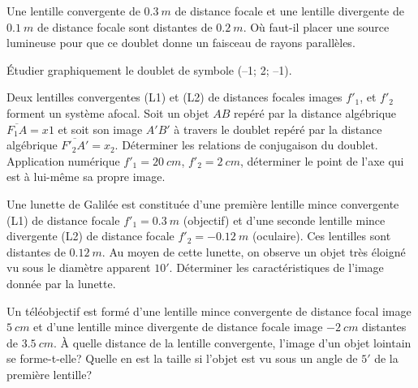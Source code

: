%
\begin{exercice}%
Une lentille convergente de \(\SI{0,3}{m}\) de distance focale et une lentille 
  divergente de \(\SI{0,1}{m}\) de distance focale sont distantes de 
  \(\SI{0,2}{m}\). Où faut-il placer une source lumineuse pour que ce doublet 
  donne un faisceau de rayons parallèles.
\end{exercice}%
%
\begin{exercice}%
Étudier graphiquement le doublet de symbole (–1; 2; –1).
\end{exercice}%
%
\begin{exercice}%
Deux lentilles convergentes (L1) et (L2) de distances focales images \(f'_1\), 
  et \(f'_2\) forment un système afocal. Soit un objet \(AB\) repéré par la 
  distance algébrique \(\overline{F_1A}= x1\) et soit son image \(A'B'\) à 
  travers le doublet repéré par la distance algébrique \(\overline{F'_2A'}= 
  x_2\). Déterminer les relations de conjugaison du doublet. Application 
  numérique \(f'_1  = \SI{20}{cm}\), \(f'_2 = \SI{2}{cm}\), déterminer le point 
  de l'axe qui est à lui-même sa propre image.
\end{exercice}%
%
\begin{exercice}%
Une lunette de Galilée est constituée d'une première lentille mince convergente 
  (L1) de distance focale \(f'_1 = \SI{0,3}{m}\) (objectif) et d'une seconde 
  lentille mince divergente (L2) de distance focale \(f'_2 = -\SI{0,12}{m}\) 
  (oculaire). Ces lentilles sont distantes de \(\SI{0,12}{m}\). Au moyen de 
  cette lunette, on observe un objet très éloigné vu sous le diamètre apparent 
  \(10'\). Déterminer les caractéristiques de l'image donnée par la lunette.
\end{exercice}%
%
\begin{exercice}[Téléobjectif]%
Un téléobjectif est formé d'une lentille mince convergente de distance focal 
  image \(\SI{5}{cm}\) et d'une lentille mince divergente de distance focale 
  image \(-\SI{2}{cm}\) distantes de \(\SI{3,5}{cm}\).
À quelle distance de la lentille convergente, l'image d'un objet lointain se 
  forme-t-elle? Quelle en est la taille si l'objet est vu sous un angle de 
  \(5'\) de la première lentille?
\end{exercice}%
%
